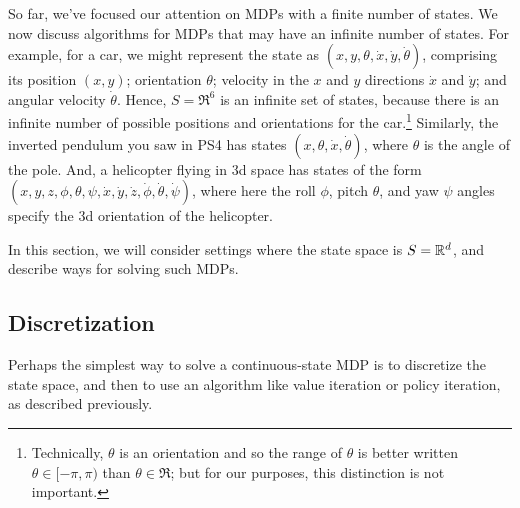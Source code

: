 \documentclass{article}
\begin{document}
So far, we've focused our attention on MDPs with a finite number of states.
We now discuss algorithms for MDPs that may have an infinite number of states.  For example, for a car,
we might represent the state as $(x,y, \theta, \dot{x}, \dot{y},\dot{\theta})$,
comprising its position $(x,y)$; orientation $\theta$; velocity in the $x$ and
$y$ directions $\dot{x}$ and $\dot{y}$; and angular velocity $\dot{\theta}$.  Hence, $S = \Re^6$ is
an infinite set of states, because there is an infinite number of possible positions
and orientations for the car.\footnote{Technically, $\theta$ is an orientation and
so the range of $\theta$ is better written $\theta \in [-\pi, \pi)$ than $\theta
\in \Re$; but for our purposes, this distinction is not important.}  Similarly,
the inverted pendulum you saw in PS4 has states $(x, \theta, \dot{x}, \dot{\theta})$,
where $\theta$ is the angle of the pole.  And, a helicopter flying in 3d space
has states of the form
$(x,y,z, \phi,\theta,\psi, \dot{x}, \dot{y}, \dot{z}, \dot{\phi}, \dot{\theta}, \dot{\psi})$,
where here the roll $\phi$, pitch $\theta$, and yaw $\psi$ angles specify the 3d
orientation of the helicopter.

In this section, we will consider settings where the state space is $S = {\mathbb R}^{d}$, and
describe ways for solving such MDPs.

\subsection{Discretization}

Perhaps the simplest way to solve a continuous-state MDP is to discretize the
state space, and then to use an algorithm like value iteration or policy
iteration, as described previously.
\end{document}
